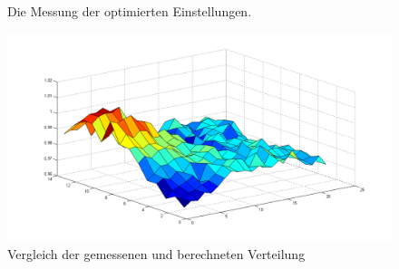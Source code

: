 \documentclass[a4paper,bibtotoc,oneside]{scrbook}
\begin{document}
\begin{figure} [htbp]
\caption{Die Messung der optimierten Einstellungen.}
\label{optm}
\end{figure} 

\begin{figure}[htbp]
\centering
\includegraphics[width=125mm]{img/vergleich_opt.png}
\caption{Vergleich der gemessenen und berechneten Verteilung}\label{v26}
\end{figure}
\end{document}
